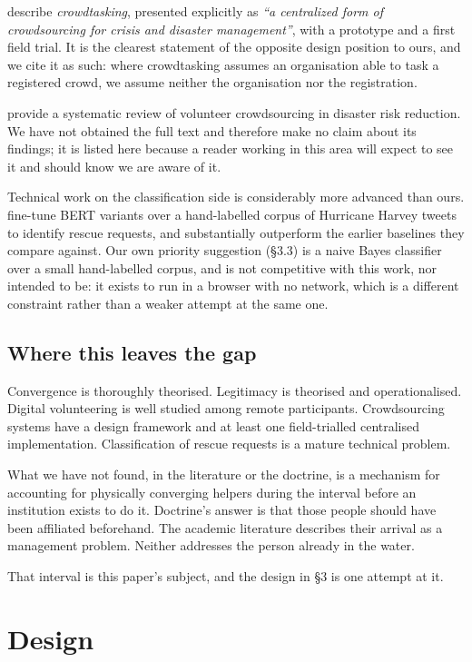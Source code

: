 \citet{auferbauer2017} describe \emph{crowdtasking}, presented
explicitly as \emph{``a centralized form of crowdsourcing for crisis and
disaster management''}, with a prototype and a first field trial. It is
the clearest statement of the opposite design position to ours, and we
cite it as such: where crowdtasking assumes an organisation able to task
a registered crowd, we assume neither the organisation nor the
registration.

\citet{kankanamge2019} provide a systematic review of volunteer
crowdsourcing in disaster risk reduction. We have not obtained the full
text and therefore make no claim about its findings; it is listed here
because a reader working in this area will expect to see it and should
know we are aware of it.

Technical work on the classification side is considerably more advanced
than ours. \citet{zhou2022} fine-tune BERT variants over a
hand-labelled corpus of Hurricane Harvey tweets to identify rescue
requests, and substantially outperform the earlier baselines they
compare against. Our own priority suggestion (§3.3) is a naive Bayes
classifier over a small hand-labelled corpus, and is not competitive
with this work, nor intended to be: it exists to run in a browser with
no network, which is a different constraint rather than a weaker attempt
at the same one.

\subsection{Where this leaves the gap}

Convergence is thoroughly theorised. Legitimacy is theorised and
operationalised. Digital volunteering is well studied among remote
participants. Crowdsourcing systems have a design framework and at least
one field-trialled centralised implementation. Classification of rescue
requests is a mature technical problem.

What we have not found, in the literature or the doctrine, is a
mechanism for accounting for physically converging helpers during the
interval before an institution exists to do it. Doctrine's answer is
that those people should have been affiliated beforehand. The academic
literature describes their arrival as a management problem. Neither
addresses the person already in the water.

That interval is this paper's subject, and the design in §3 is one
attempt at it.

\section{Design}

